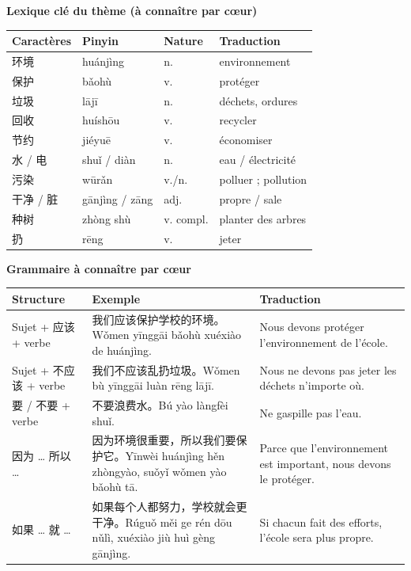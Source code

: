\documentclass[11pt]{article}
\begin{document}
\begin{bilan}
\textbf{Lexique clé du thème (à connaître par cœur)}

\begin{center}
\begin{tabularx}{\linewidth}{|X|X|X|X|}
\hline
\rowcolor{popblueL} Caractères & Pinyin & Nature & Traduction \\
\hline
环境 & huánjìng & n. & environnement \\
\hline
保护 & bǎohù & v. & protéger \\
\hline
垃圾 & lājī & n. & déchets, ordures \\
\hline
回收 & huíshōu & v. & recycler \\
\hline
节约 & jiéyuē & v. & économiser \\
\hline
水 / 电 & shuǐ / diàn & n. & eau / électricité \\
\hline
污染 & wūrǎn & v./n. & polluer ; pollution \\
\hline
干净 / 脏 & gānjìng / zāng & adj. & propre / sale \\
\hline
种树 & zhòng shù & v. compl. & planter des arbres \\
\hline
扔 & rēng & v. & jeter \\
\hline
\end{tabularx}
\end{center}

\textbf{Grammaire à connaître par cœur}

\begin{center}
\begin{tabularx}{\linewidth}{|X|X|X|}
\hline
\rowcolor{popblueL} Structure & Exemple & Traduction \\
\hline
Sujet + 应该 + verbe & 我们应该保护学校的环境。Wǒmen yīnggāi bǎohù xuéxiào de huánjìng. & Nous devons protéger l'environnement de l'école. \\
\hline
Sujet + 不应该 + verbe & 我们不应该乱扔垃圾。Wǒmen bù yīnggāi luàn rēng lājī. & Nous ne devons pas jeter les déchets n'importe où. \\
\hline
要 / 不要 + verbe & 不要浪费水。Bú yào làngfèi shuǐ. & Ne gaspille pas l'eau. \\
\hline
因为 … 所以 … & 因为环境很重要，所以我们要保护它。Yīnwèi huánjìng hěn zhòngyào, suǒyǐ wǒmen yào bǎohù tā. & Parce que l'environnement est important, nous devons le protéger. \\
\hline
如果 … 就 … & 如果每个人都努力，学校就会更干净。Rúguǒ měi ge rén dōu nǔlì, xuéxiào jiù huì gèng gānjìng. & Si chacun fait des efforts, l'école sera plus propre. \\
\hline
\end{tabularx}
\end{center}


\end{bilan}
\end{document}
